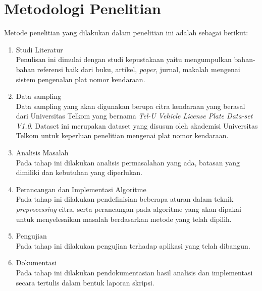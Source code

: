 \section{Metodologi Penelitian}
\noindent Metode penelitian yang dilakukan dalam penelitian ini adalah sebagai berikut:
\begin{enumerate}[nolistsep,leftmargin=0.5cm]
\item Studi Literatur \\
Penulisan ini dimulai dengan studi kepustakaan yaitu mengumpulkan bahan-bahan referensi baik dari buku, artikel, \textit{paper}, jurnal, makalah mengenai sistem pengenalan plat nomor kendaraan.
\item Data sampling \\
Data sampling yang akan digunakan berupa citra kendaraan yang berasal dari Universitas Telkom yang bernama \textit{Tel-U Vehicle License Plate Data-set V1.0}. Dataset ini merupakan dataset yang disusun oleh akademisi Universitas Telkom untuk keperluan penelitian mengenai plat nomor kendaraan.
\item Analisis Masalah \\
Pada tahap ini dilakukan analisis permasalahan yang ada, batasan yang dimiliki dan kebutuhan yang diperlukan.
\item Perancangan dan Implementasi Algoritme \\
Pada tahap ini dilakukan pendefinisian beberapa aturan dalam teknik \textit{preprocessing} citra, serta perancangan pada algoritme yang akan dipakai untuk menyelesaikan masalah berdasarkan metode yang telah dipilih.
\item Pengujian \\
Pada tahap ini dilakukan pengujian terhadap aplikasi yang telah dibangun.
\item Dokumentasi \\
Pada tahap ini dilakukan pendokumentasian hasil analisis dan implementasi secara tertulis dalam bentuk laporan skripsi. \\
\end{enumerate}

